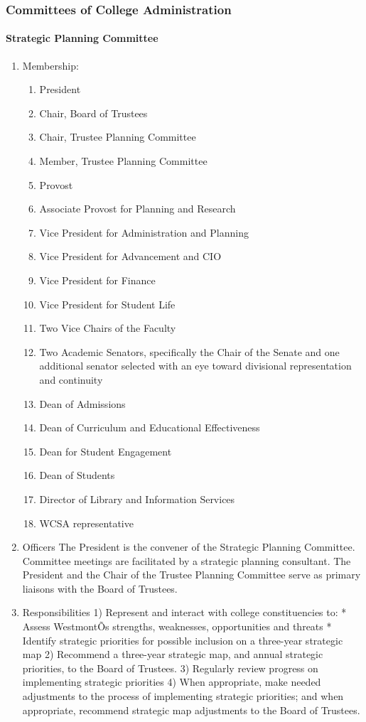 \documentclass[letterpaper, 11pt]{article}
\begin{document}
		\subsubsection{Committees of College Administration}
			\paragraph{Strategic Planning Committee}
				\begin{enumerate}[label=\alph*)]
					\item{Membership:
						\begin{enumerate}[label=\arabic*)]
							\item{President}
							\item{Chair, Board of Trustees}
							\item{Chair, Trustee Planning Committee}
							\item{Member, Trustee Planning Committee}
							\item{Provost}
							\item{Associate Provost for Planning and Research}
							\item{Vice President for Administration and Planning}
							\item{Vice President for Advancement and CIO}
							\item{Vice President for Finance}
							\item{Vice President for Student Life}
							\item{Two Vice Chairs of the Faculty}
							\item{Two Academic Senators, specifically the Chair of the Senate and one additional senator selected with an eye toward divisional representation and continuity}
							\item{Dean of Admissions}
							\item{Dean of Curriculum and Educational Effectiveness}
							\item{Dean for Student Engagement}
							\item{Dean of Students}
							\item{Director of Library and Information Services}
							\item{WCSA representative}
						\end{enumerate}
					}
					\item{ Officers
						The President is the convener of the Strategic Planning Committee.  Committee meetings are facilitated by a strategic planning consultant.  The President and the Chair of the Trustee Planning Committee serve as primary liaisons with the Board of Trustees.}
					\item{Responsibilities
						1) Represent and interact with college constituencies to:
						* Assess WestmontÕs strengths, weaknesses, opportunities and threats
						* Identify strategic priorities for possible inclusion on a three-year strategic map
						2) Recommend a three-year strategic map, and annual strategic priorities, to the Board of Trustees.
						3) Regularly review progress on implementing strategic priorities
						4) When appropriate, make needed adjustments to the process of implementing strategic priorities; and when appropriate, recommend strategic map adjustments to the Board of Trustees.}
				\end{enumerate}
\end{document}
